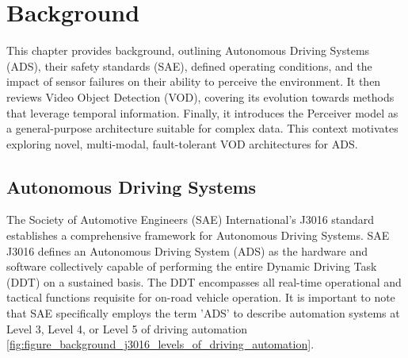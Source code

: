 \section{Background}  \label{Background}

This chapter provides background, outlining Autonomous Driving Systems (ADS), their safety standards (SAE), defined operating conditions, and the impact of sensor failures on their ability to perceive the environment. It then reviews Video Object Detection (VOD), covering its evolution towards methods that leverage temporal information. Finally, it introduces the Perceiver model as a general-purpose architecture suitable for complex data. This context motivates exploring novel, multi-modal, fault-tolerant VOD architectures for ADS.

\subsection{Autonomous Driving Systems} \label{Background:AutonomousDrivingSystems}


The Society of Automotive Engineers (SAE) International's J3016 standard \cite{sae:j3016:2021apr} establishes a comprehensive framework for Autonomous Driving Systems. SAE J3016 \cite{sae:j3016:2021apr} defines an Autonomous Driving System (ADS) as the hardware and software collectively capable of performing the entire Dynamic Driving Task (DDT) on a sustained basis. The DDT encompasses all real-time operational and tactical functions requisite for on-road vehicle operation. It is important to note that SAE specifically employs the term 'ADS' to describe automation systems at Level 3, Level 4, or Level 5 of driving automation \ref{fig:figure_background_j3016_levels_of_driving_automation}.

